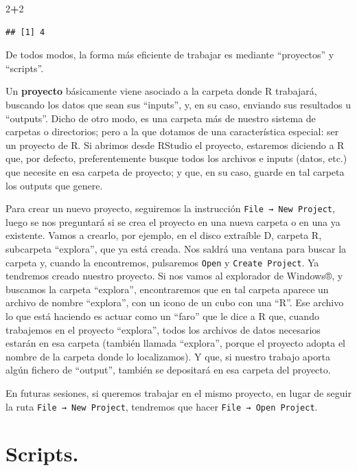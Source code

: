 \documentclass[
]{book}
\newenvironment{Shaded}{\begin{snugshade}}{\end{snugshade}}
\newcommand{\DecValTok}[1]{\textcolor[rgb]{0.00,0.00,0.81}{#1}}
\newcommand{\SpecialCharTok}[1]{\textcolor[rgb]{0.81,0.36,0.00}{\textbf{#1}}}
\begin{document}
\begin{Shaded}
\begin{Highlighting}[]
\DecValTok{2}\SpecialCharTok{+}\DecValTok{2}
\end{Highlighting}
\end{Shaded}

\begin{verbatim}
## [1] 4
\end{verbatim}

De todos modos, la forma más eficiente de trabajar es mediante ``proyectos'' y ``scripts''.

Un \textbf{proyecto} básicamente viene asociado a la carpeta donde R trabajará, buscando los datos que sean sus ``inputs'', y, en su caso, enviando sus resultados u ``outputs''. Dicho de otro modo, es una carpeta más de nuestro sistema de carpetas o directorios; pero a la que dotamos de una característica especial: ser un proyecto de R. Si abrimos desde RStudio el proyecto, estaremos diciendo a R que, por defecto, preferentemente busque todos los archivos e inputs (datos, etc.) que necesite en esa carpeta de proyecto; y que, en su caso, guarde en tal carpeta los outputs que genere.

Para crear un nuevo proyecto, seguiremos la instrucción \texttt{File\ →\ New\ Project}, luego se nos preguntará si se crea el proyecto en una nueva carpeta o en una ya existente. Vamos a crearlo, por ejemplo, en el disco extraíble D, carpeta R, subcarpeta ``explora'', que ya está creada. Nos saldrá una ventana para buscar la carpeta y, cuando la encontremos, pulsaremos \texttt{Open} y \texttt{Create\ Project}. Ya tendremos creado nuestro proyecto. Si nos vamos al explorador de Windows®, y buscamos la carpeta ``explora'', encontraremos que en tal carpeta aparece un archivo de nombre ``explora'', con un icono de un cubo con una ``R''. Ese archivo lo que está haciendo es actuar como un ``faro'' que le dice a R que, cuando trabajemos en el proyecto ``explora'', todos los archivos de datos necesarios estarán en esa carpeta (también llamada ``explora'', porque el proyecto adopta el nombre de la carpeta donde lo localizamos). Y que, si nuestro trabajo aporta algún fichero de ``output'', también se depositará en esa carpeta del proyecto.

En futuras sesiones, si queremos trabajar en el mismo proyecto, en lugar de seguir la ruta \texttt{File\ →\ New\ Project}, tendremos que hacer \texttt{File\ →\ Open\ Project}.

\section{Scripts.}\label{scripts.}
\end{document}
